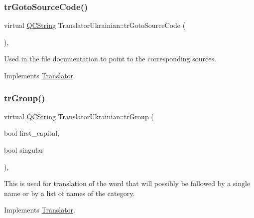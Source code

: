 \mbox{\label{class_translator_ukrainian_ab7b1344212c46987c69a13f25e991ad3}} 
\subsubsection{\texorpdfstring{trGotoSourceCode()}{trGotoSourceCode()}}
{\footnotesize\ttfamily virtual \mbox{\hyperlink{class_q_c_string}{Q\+C\+String}} Translator\+Ukrainian\+::tr\+Goto\+Source\+Code (\begin{DoxyParamCaption}{ }\end{DoxyParamCaption})\hspace{0.3cm}{\ttfamily [inline]}, {\ttfamily [virtual]}}

Used in the file documentation to point to the corresponding sources. 

Implements \mbox{\hyperlink{class_translator}{Translator}}.

\mbox{\label{class_translator_ukrainian_ac44756ba6b75ad452c82494b33dd460d}} 
\subsubsection{\texorpdfstring{trGroup()}{trGroup()}}
{\footnotesize\ttfamily virtual \mbox{\hyperlink{class_q_c_string}{Q\+C\+String}} Translator\+Ukrainian\+::tr\+Group (\begin{DoxyParamCaption}\item[{bool}]{first\+\_\+capital,  }\item[{bool}]{singular }\end{DoxyParamCaption})\hspace{0.3cm}{\ttfamily [inline]}, {\ttfamily [virtual]}}

This is used for translation of the word that will possibly be followed by a single name or by a list of names of the category. 

Implements \mbox{\hyperlink{class_translator}{Translator}}.

\mbox{\label{class_translator_ukrainian_afce0133e3a5648bf07bc40bb77b9ef85}} 
